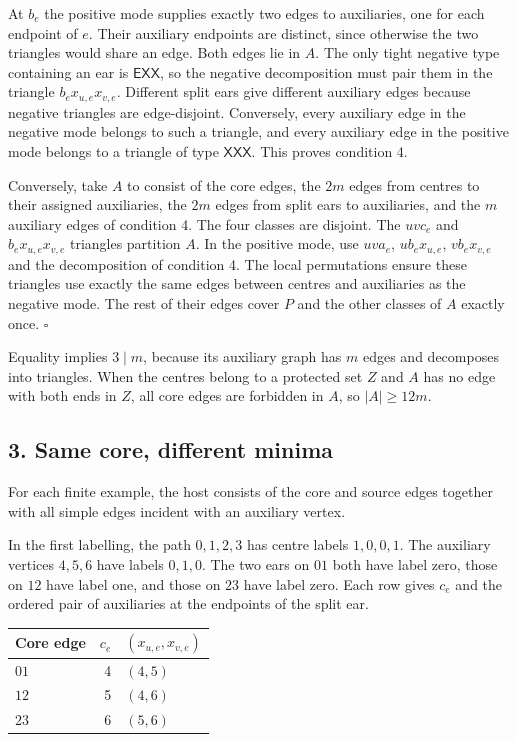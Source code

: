 \documentclass[english,11pt,a4paper]{article}
\newcounter{none}
\begin{document}
At \(b_e\) the positive mode supplies exactly two edges to auxiliaries, one for each endpoint of \(e\). Their auxiliary endpoints are distinct, since otherwise the two triangles would share an edge. Both edges lie in \(A\). The only tight negative type containing an ear is \(\mathsf{EXX}\), so the negative decomposition must pair them in the triangle \(b_ex_{u,e}x_{v,e}\). Different split ears give different auxiliary edges because negative triangles are edge-disjoint. Conversely, every auxiliary edge in the negative mode belongs to such a triangle, and every auxiliary edge in the positive mode belongs to a triangle of type \(\mathsf{XXX}\). This proves condition 4.

Conversely, take \(A\) to consist of the core edges, the \(2m\) edges from centres to their assigned auxiliaries, the \(2m\) edges from split ears to auxiliaries, and the \(m\) auxiliary edges of condition 4. The four classes are disjoint. The \(uvc_e\) and \(b_ex_{u,e}x_{v,e}\) triangles partition \(A\). In the positive mode, use \(uva_e\), \(ub_ex_{u,e}\), \(vb_ex_{v,e}\) and the decomposition of condition 4. The local permutations ensure these triangles use exactly the same edges between centres and auxiliaries as the negative mode. The rest of their edges cover \(P\) and the other classes of \(A\) exactly once. \(\square\)

Equality implies \(3\mid m\), because its auxiliary graph has \(m\) edges and decomposes into triangles. When the centres belong to a protected set \(Z\) and \(A\) has no edge with both ends in \(Z\), all core edges are forbidden in \(A\), so \(|A|\ge12m\).

\subsection{3. Same core, different minima}\label{same-core-different-minima}

For each finite example, the host consists of the core and source edges together with all simple edges incident with an auxiliary vertex.

In the first labelling, the path \(0,1,2,3\) has centre labels \(1,0,0,1\). The auxiliary vertices \(4,5,6\) have labels \(0,1,0\). The two ears on \(01\) both have label zero, those on \(12\) have label one, and those on \(23\) have label zero. Each row gives \(c_e\) and the ordered pair of auxiliaries at the endpoints of the split ear.

{\def\LTcaptype{none} %
\begin{longtable}[]{@{}lrl@{}}
\toprule\noalign{}
Core edge & \(c_e\) & \((x_{u,e},x_{v,e})\) \\
\midrule\noalign{}
\endhead
\bottomrule\noalign{}
\endlastfoot
\(01\) & 4 & \((4,5)\) \\
\(12\) & 5 & \((4,6)\) \\
\(23\) & 6 & \((5,6)\) \\
\end{longtable}
}
\end{document}
